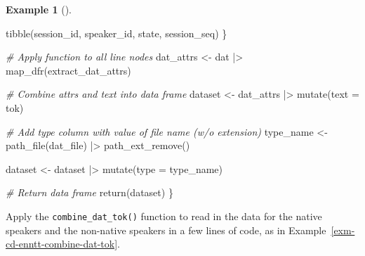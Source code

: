 \documentclass[
  letterpaper,
  DIV=11,
  numbers=noendperiod]{scrreprt}
\newenvironment{Shaded}{\begin{snugshade}}{\end{snugshade}}
\newcommand{\AttributeTok}[1]{\textcolor[rgb]{0.00,0.00,0.00}{#1}}
\newcommand{\CommentTok}[1]{\textcolor[rgb]{0.00,0.00,0.00}{\textit{#1}}}
\newcommand{\FunctionTok}[1]{\textcolor[rgb]{0.00,0.00,0.00}{#1}}
\newcommand{\NormalTok}[1]{\textcolor[rgb]{0.00,0.00,0.00}{#1}}
\newcommand{\OtherTok}[1]{\textcolor[rgb]{0.00,0.00,0.00}{#1}}
\newcommand{\SpecialCharTok}[1]{\textcolor[rgb]{0.00,0.00,0.00}{#1}}
\theoremstyle{definition}
\newtheorem{example}{Example}[chapter]
\theoremstyle{remark}
\begin{document}
\begin{example}[]
\begin{Shaded}
\begin{Highlighting}[]
    \FunctionTok{tibble}\NormalTok{(session\_id, speaker\_id, state, session\_seq)}
\NormalTok{  \}}

  \CommentTok{\# Apply function to all line nodes}
\NormalTok{  dat\_attrs }\OtherTok{\textless{}{-}}
\NormalTok{    dat }\SpecialCharTok{|\textgreater{}}
    \FunctionTok{map\_dfr}\NormalTok{(extract\_dat\_attrs)}

  \CommentTok{\# Combine attrs and text into data frame}
\NormalTok{  dataset }\OtherTok{\textless{}{-}}
\NormalTok{    dat\_attrs }\SpecialCharTok{|\textgreater{}}
    \FunctionTok{mutate}\NormalTok{(}\AttributeTok{text =}\NormalTok{ tok)}

  \CommentTok{\# Add type column with value of file name (w/o extension)}
\NormalTok{  type\_name }\OtherTok{\textless{}{-}} \FunctionTok{path\_file}\NormalTok{(dat\_file) }\SpecialCharTok{|\textgreater{}} \FunctionTok{path\_ext\_remove}\NormalTok{()}

\NormalTok{  dataset }\OtherTok{\textless{}{-}}
\NormalTok{    dataset }\SpecialCharTok{|\textgreater{}}
    \FunctionTok{mutate}\NormalTok{(}\AttributeTok{type =}\NormalTok{ type\_name)}

  \CommentTok{\# Return data frame}
  \FunctionTok{return}\NormalTok{(dataset)}
\NormalTok{\}}
\end{Highlighting}
\end{Shaded}

\end{example}

Apply the \texttt{combine\_dat\_tok()} function to read in the data for
the native speakers and the non-native speakers in a few lines of code,
as in Example~\ref{exm-cd-enntt-combine-dat-tok}.
\end{document}
